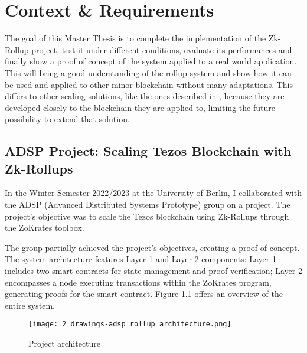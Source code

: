\chapter{Context \& Requirements\label{cha:chapter4}}
The goal of this Master Thesis is to complete the implementation of the Zk-Rollup project, test it under different conditions, evaluate its performances and finally show a proof of concept of the system applied to a real world application. This will bring a good understanding of the rollup system and show how it can be used and applied to other minor blockchain without many adaptations. This differs to other scaling solutions, like the ones described in \cite{yang_review_2020}, because they are developed closely to the blockchain they are applied to, limiting the future possibility to extend that solution.

\section{ADSP Project: Scaling Tezos Blockchain with Zk-Rollups \label{sec:2_adspProject}}

In the Winter Semester 2022/2023 at the University of Berlin, I collaborated with the ADSP (Advanced Distributed Systems Prototype) group on a project. The project's objective was to scale the Tezos blockchain using Zk-Rollups through the ZoKrates toolbox.

The group partially achieved the project's objectives, creating a proof of concept. The system architecture features Layer 1 and Layer 2 components: Layer 1 includes two smart contracts for state management and proof verification; Layer 2 encompasses a node executing transactions within the ZoKrates program, generating proofs for the smart contract. Figure \ref{fig:3_general_rollup_architecture} offers an overview of the entire system.

\begin{figure}[ht]
  \centering
  \texttt{[image: 2\_drawings-adsp\_rollup\_architecture.png]}
  \caption[Project Architecture]{Project architecture}  
  \label{fig:3_general_rollup_architecture}
\end{figure}

